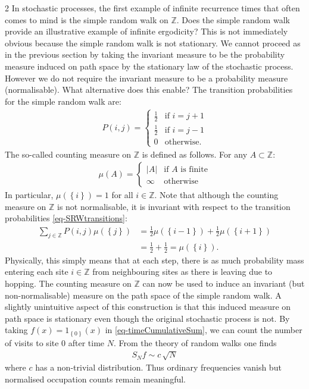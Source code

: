 \documentclass[11pt]{article}
\begin{document}
\begin{multicols}{2}
In stochastic processes, the first example of infinite recurrence times that often comes to mind is the simple random walk on $\mathbb{Z}$.
Does the simple random walk provide an illustrative example of infinite ergodicity?
This is not immediately obvious because the simple random walk is not stationary.
We cannot proceed as in the previous section by taking the invariant measure to be the probability measure induced on path space by the stationary law of the stochastic process.
However we do not require the invariant measure to be a probability measure (normalisable).
What alternative does this enable?
The transition probabilities for the simple random walk are:
\begin{align}
\label{eq-SRWtransitions}
P(i,j) = \left\{
\begin{array}{ll}
\frac{1}{2}&\text{if $i=j+1$}\\
\frac{1}{2}&\text{if $i=j-1$}\\
0&\text{otherwise.}
\end{array}
\right.
\end{align}
The so-called counting measure on $\mathbb{Z}$ is defined as follows.
For any $A \subset \mathbb{Z}$:
\begin{align}
\mu(A) = \left\{
\begin{array}{ll}
| A | & \text{if $A$ is finite}\\
\infty & \text{otherwise}
\end{array}
\right.
\end{align}
In particular, $\mu(\left\{ i \right\} )=1$ for all $i \in \mathbb{Z}$.
Note that although the counting measure on $\mathbb{Z}$ is not normalisable, it is invariant with respect to the transition probabilities \eqref{eq-SRWtransitions}:
\begin{align*}
\sum_{j \in \mathbb{Z}} P(i, j) \mu(\left\{ j \right\} ) &= \frac{1}{2} \mu(\left\{ i -1 \right\} ) + \frac{1}{2} \mu(\left\{ i+1 \right\} )\\
& = \frac{1}{2} + \frac{1}{2}  = \mu(\left\{ i \right\} ).
\end{align*}
Physically, this simply means that at each step, there is as much probability mass entering each site  $i \in \mathbb{Z}$  from neighbouring sites as there is leaving due to hopping.
The counting measure on $\mathbb{Z}$ can now be used to induce an invariant (but non-normalisable) measure on the path space of the simple random walk.
A slightly unintuitive aspect of this construction is that this induced measure on path space is stationary even though the original stochastic process is not.
By taking $f(x) = 1_{\left\{0\right\}}(x)$ in \eqref{eq-timeCumulativeSum}, we can count the number of visits to site $0$ after time $N$.
From the theory of random walks one finds
\begin{align}
S_N f \sim c \, \sqrt{N}
\end{align}
where $c$ has a non-trivial distribution.
Thus ordinary frequencies vanish but normalised occupation counts remain meaningful.


\end{multicols}
\end{document}
